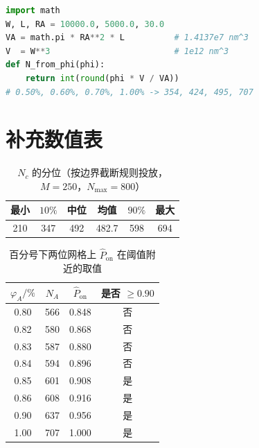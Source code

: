 \documentclass[UTF8,a4paper,zihao=-4,fontset=none]{ctexart}
\begin{document}
\begin{lstlisting}[language=Python,caption={体积分数与个数换算}]
import math
W, L, RA = 10000.0, 5000.0, 30.0
VA = math.pi * RA**2 * L          # 1.4137e7 nm^3
V  = W**3                         # 1e12 nm^3
def N_from_phi(phi):
    return int(round(phi * V / VA))
# 0.50%, 0.60%, 0.70%, 1.00% -> 354, 424, 495, 707
\end{lstlisting}

\section{补充数值表}

\begin{table}[H]
\centering
\caption{$N_c$ 的分位（按边界截断规则投放，$M=250$，$N_{\max}=800$）}
\begin{tabular}{cccccc}
\toprule
最小 & $10\%$ & 中位 & 均值 & $90\%$ & 最大 \\
\midrule
210 & 347 & 492 & 482.7 & 598 & 694 \\
\bottomrule
\end{tabular}
\end{table}

\begin{table}[H]
\centering
\caption{百分号下两位网格上 $\hat P_{\mathrm{on}}$ 在阈值附近的取值}
\begin{tabular}{cccc}
\toprule
$\varphi_A/\%$ & $N_A$ & $\hat P_{\mathrm{on}}$ & 是否 $\ge 0.90$ \\
\midrule
0.80 & 566 & 0.848 & 否 \\
0.82 & 580 & 0.868 & 否 \\
0.83 & 587 & 0.880 & 否 \\
0.84 & 594 & 0.896 & 否 \\
0.85 & 601 & 0.908 & 是 \\
0.86 & 608 & 0.916 & 是 \\
0.90 & 637 & 0.956 & 是 \\
1.00 & 707 & 1.000 & 是 \\
\bottomrule
\end{tabular}
\end{table}
\end{document}

